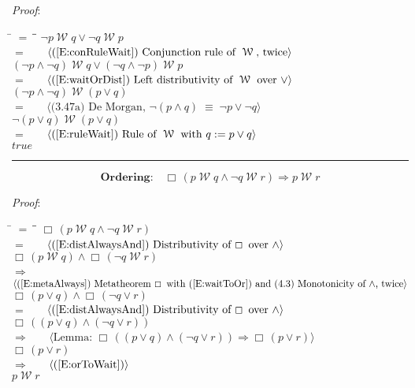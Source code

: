 \documentclass[12pt, fleqn, leqno]{article}
\newcommand{\lgap}{2pt}                             %
\newcommand{\mymathindent}{24pt}                    %
\newcommand{\equivs}{\ensuremath{\;\equiv\;}}       %
\newcommand{\impl}{\ensuremath{\Rightarrow}}        %
\newcommand{\Wait}{\;\mathcal{W}\;}
\newcommand{\Always}{\Box\,}
\newcommand{\myqed}{\rule[-.23ex]{1.2ex}{2.0ex}}
\newcommand{\myqedtab}{\hspace{384pt}}              %
\newcommand{\Gll} {\langle}                         %
\newcommand{\Ggg} {\rangle}                         %
\newcommand{\Hint}[1]     {\ \ \ $\Gll              \mbox{#1} \Ggg$ }   %
\begin{document}
\emph{Proof}:
\begin{tabbing}
\hspace{\mymathindent} \= $= \;$ \= \myqedtab \= \kill
  \> \>   $\neg p \Wait q \lor \neg q \Wait p$\\[\lgap]
  \> $=$ \> \Hint{(\ref{E:conRuleWait}) Conjunction rule of $\Wait$, twice}\\[\lgap]
  \> \>   $(\neg p\land \neg q) \Wait q \lor (\neg q \land \neg p)\Wait p$\\[\lgap]
  \> $=$  \>  \Hint{(\ref{E:waitOrDist}) Left distributivity of $\Wait$ over $\lor$}\\[\lgap]
  \> \>   $(\neg p\land \neg q) \Wait (p\lor q)$\\[\lgap]
  \> $=$  \>  \Hint{(3.47a) De Morgan, $\neg(p\land q)\equivs \neg p\lor\neg q$}\\[\lgap]
  \> \>   $\neg (p\lor q)\Wait (p\lor q)$\\[\lgap]
  \> $=$  \>  \Hint{(\ref{E:ruleWait}) Rule of $\Wait$ with $q := p\lor q$}\\[\lgap]
  \> \>   $true$ \quad \myqed
\end{tabbing}
\begin{equation}\label{E:waitOrderingTwo}
\textbf{Ordering:}\quad \Always (p \Wait q \land \neg q \Wait r) \impl p \Wait r
\end{equation}

\emph{Proof}:
\begin{tabbing}
\hspace{\mymathindent} \= $= \;$ \= \myqedtab \= \kill
  \> \>   $\Always (p \Wait q \land \neg q \Wait r)$\\[\lgap]
  \> $=$ \> \Hint{(\ref{E:distAlwaysAnd}) Distributivity of $\Always$ over $\land$}\\[\lgap]
  \> \>   $\Always (p \Wait q) \land \Always(\neg q \Wait r)$\\[\lgap]
  \> $\impl$  \>  \Hint{(\ref{E:metaAlways}) Metatheorem $\Always$ with (\ref{E:waitToOr}) and (4.3) Monotonicity of $\land$, twice}\\[\lgap]
  \> \>   $\Always (p \lor q) \land \Always(\neg q \lor r)$\\[\lgap]
  \> $=$ \> \Hint{(\ref{E:distAlwaysAnd}) Distributivity of $\Always$ over $\land$}\\[\lgap]
  \> \>   $\Always ((p \lor q) \land (\neg q \lor r))$\\[\lgap]
  \> $\impl$  \>  \Hint{Lemma: $\Always ((p \lor q) \land (\neg q \lor r))\impl \Always(p\lor r)$}\\[\lgap]
  \> \>   $\Always (p \lor r)$\\[\lgap]
  \> $\impl$  \>  \Hint{(\ref{E:orToWait})}\\[\lgap]
  \> \>   $p\Wait r$
\end{tabbing}
\end{document}
